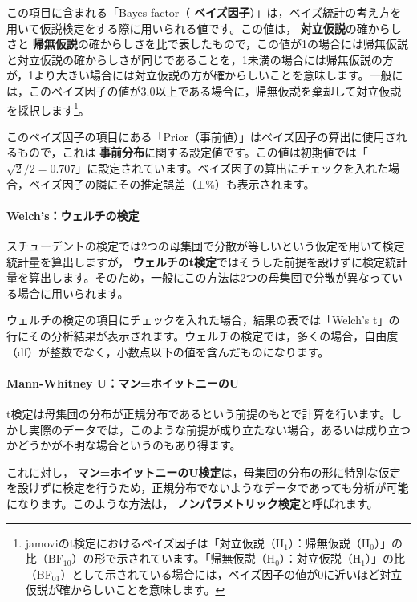 \documentclass[
  12pt,
  a5jpaper,
  lualatex, ja=standard]{bxjsbook}
\renewcommand{\emph}[1]{\textbf{\color{emph} #1}}
\begin{document}
この項目に含まれる「Bayes factor（\emph{ベイズ因子}）」は，ベイズ統計の考え方を用いて仮説検定をする際に用いられる値です。この値は，\emph{対立仮説}の確からしさと\emph{帰無仮説}の確からしさを比で表したもので，この値が1の場合には帰無仮説と対立仮説の確からしさが同じであることを，1未満の場合には帰無仮説の方が，1より大きい場合には対立仮説の方が確からしいことを意味します。一般には，このベイズ因子の値が3.0以上である場合に，帰無仮説を棄却して対立仮説を採択します\footnote{jamoviのt検定におけるベイズ因子は「対立仮説（H\(_1\)）：帰無仮説（H\(_0\)）」の比（BF\(_{10}\)）の形で示されています。「帰無仮説（H\(_0\)）：対立仮説（H\(_1\)）」の比（BF\(_{01}\)）として示されている場合には，ベイズ因子の値が0に近いほど対立仮説が確からしいことを意味します。}。

このベイズ因子の項目にある「Prior（事前値）」はベイズ因子の算出に使用されるもので，これは\emph{事前分布}に関する設定値です。この値は初期値では「\(\sqrt{2}/2=0.707\)」に設定されています。ベイズ因子の算出にチェックを入れた場合，ベイズ因子の隣にその推定誤差（±\%）も表示されます。

\hypertarget{subsub:ttest-welch}{%
\paragraph*{Welch's：ウェルチの検定}\label{subsub:ttest-welch}}

スチューデントの検定では2つの母集団で分散が等しいという仮定を用いて検定統計量を算出しますが，\emph{ウェルチのt検定}ではそうした前提を設けずに検定統計量を算出します。そのため，一般にこの方法は2つの母集団で分散が異なっている場合に用いられます。

ウェルチの検定の項目にチェックを入れた場合，結果の表では「Welch's t」の行にその分析結果が表示されます。ウェルチの検定では，多くの場合，自由度（df）が整数でなく，小数点以下の値を含んだものになります。

\hypertarget{subsub:ttest-mann}{%
\paragraph*{Mann-Whitney U：マン=ホイットニーのU}\label{subsub:ttest-mann}}

t検定は母集団の分布が正規分布であるという前提のもとで計算を行います。しかし実際のデータでは，このような前提が成り立たない場合，あるいは成り立つかどうかが不明な場合というのもあり得ます。

これに対し，\emph{マン=ホイットニーのU検定}は，母集団の分布の形に特別な仮定を設けずに検定を行うため，正規分布でないようなデータであっても分析が可能になります。このような方法は，\emph{ノンパラメトリック検定}と呼ばれます。
\end{document}
